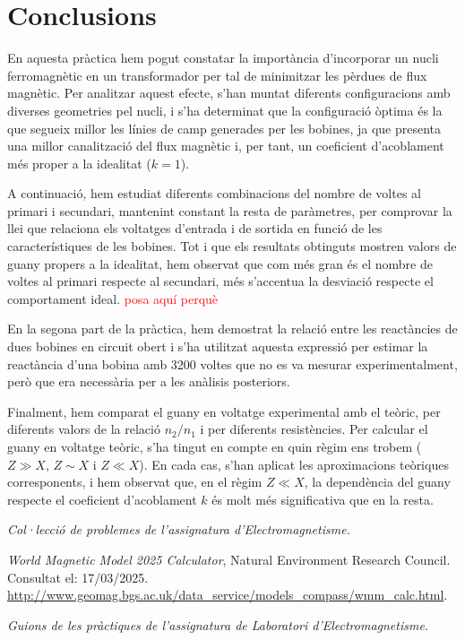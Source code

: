 \documentclass[a4paper,10.5pt]{report}
\begin{document}
\section{Conclusions}
En aquesta pràctica hem pogut constatar la importància d'incorporar un nucli ferromagnètic en un transformador per tal de minimitzar les pèrdues de flux magnètic. Per analitzar aquest efecte, s’han muntat diferents configuracions amb diverses geometries pel nucli, i s’ha determinat que la configuració òptima és la que segueix millor les línies de camp generades per les bobines, ja que presenta una millor canalització del flux magnètic i, per tant, un coeficient d’acoblament més proper a la idealitat ($k = 1$).

A continuació, hem estudiat diferents combinacions del nombre de voltes al primari i secundari, mantenint constant la resta de paràmetres, per comprovar la llei que relaciona els voltatges d'entrada i de sortida en funció de les característiques de les bobines. Tot i que els resultats obtinguts mostren valors de guany propers a la idealitat, hem observat que com més gran és el nombre de voltes al primari respecte al secundari, més s’accentua la desviació respecte el comportament ideal. \textcolor{red}{posa aquí perquè}

En la segona part de la pràctica, hem demostrat la relació entre les reactàncies de dues bobines en circuit obert i s’ha utilitzat aquesta expressió per estimar la reactància d’una bobina amb 3200 voltes que no es va mesurar experimentalment, però que era necessària per a les anàlisis posteriors.

Finalment, hem comparat el guany en voltatge experimental amb el teòric, per diferents valors de la relació $n_2/n_1$ i per diferents resistències. Per calcular el guany en voltatge teòric, s'ha tingut en compte en quin règim ens trobem ($Z \gg X$, $Z \sim X$ i $Z \ll X$). En cada cas, s’han aplicat les aproximacions teòriques corresponents, i hem observat que, en el règim $Z \ll X$, la dependència del guany respecte el coeficient d’acoblament $k$ és molt més significativa que en la resta.


\begin{thebibliography}{99}
	\textit{Col·lecció de problemes de l'assignatura d'Electromagnetisme.}
	
	\textit{World Magnetic Model 2025 Calculator}, Natural Environment Research Council. Consultat el: 17/03/2025.\\ 
	\url{http://www.geomag.bgs.ac.uk/data_service/models_compass/wmm_calc.html}.
	
	\textit{Guions de les pràctiques de l'assignatura de Laboratori d'Electromagnetisme}.
\end{thebibliography}
\end{document}
